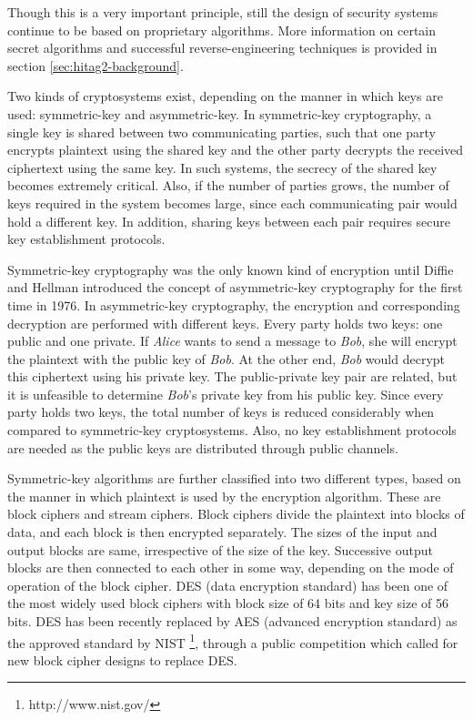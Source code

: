 Though this is a very important principle, still the design of security systems continue to be based on proprietary algorithms. More information on certain secret algorithms and successful reverse-engineering techniques is provided in section \ref{sec:hitag2-background}.

Two kinds of cryptosystems exist, depending on the manner in which keys are used: symmetric-key and asymmetric-key. In symmetric-key cryptography, a single key is shared between two communicating parties, such that one party encrypts plaintext using the shared key and the other party decrypts the received ciphertext using the same key. In such systems, the secrecy of the shared key becomes extremely critical. Also, if the number of parties grows, the number of keys required in the system becomes large, since each communicating pair would hold a different key. In addition, sharing keys between each pair requires secure key establishment protocols. 

Symmetric-key cryptography was the only known kind of encryption until Diffie and Hellman introduced the concept of asymmetric-key cryptography \cite{diffie1976ndc} for the first time in 1976. In asymmetric-key cryptography, the encryption and corresponding decryption are performed with different keys. Every party holds two keys: one public and one private. If \emph{Alice} wants to send a message to \emph{Bob}, she will encrypt the plaintext with the public key of \emph{Bob}. At the other end, \emph{Bob} would decrypt this ciphertext using his private key. The public-private key pair are related, but it is unfeasible to determine \emph{Bob}'s private key from his public key. Since every party holds two keys, the total number of keys is reduced considerably when compared to symmetric-key cryptosystems. Also, no key establishment protocols are needed as the public keys are distributed through public channels.

Symmetric-key algorithms are further classified into two different types, based on the manner in which plaintext is used by the encryption algorithm. These are block ciphers and stream ciphers. Block ciphers divide the plaintext into blocks of data, and each block is then encrypted separately. The sizes of the input and output blocks are same, irrespective of the size of the key. Successive output blocks are then connected to each other in some way, depending on the mode of operation of the block cipher. DES (data encryption standard) has been one of the most widely used block ciphers with block size of 64 bits and key size of 56 bits. DES has been recently replaced by AES (advanced encryption standard) as the approved standard by NIST \footnote{http://www.nist.gov/}, through a public competition \cite{aes-process-wiki} which called for new block cipher designs to replace DES.

